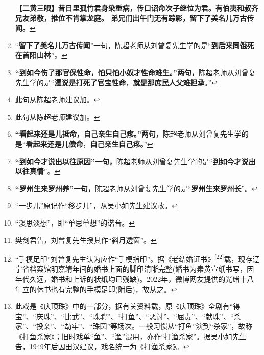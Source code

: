 \begin{enumerate}
  \textbf{【二黄三眼】昔日里孤竹君身染重病，传口诏命次子继位为君。有伯夷和叔齐兄友弟敬，推位不肯掌龙庭。
  弟兄们出午门无有踪影，留下了美名儿万古传闻。}\protect\hyperlink{fnref502}{↩}
\item
  \leavevmode\hypertarget{fn503}{}%
  ``\textbf{留下了美名儿万古传闻}''一句，陈超老师从刘曾复先生学的是``\textbf{到后来同饿死在首阳山林}''。\protect\hyperlink{fnref503}{↩}
\item
  \leavevmode\hypertarget{fn504}{}%
  \textbf{``到如今伤了那官保性命，怕只怕小奴才性命难生。''两句，}陈超老师从刘曾复先生学的是``\textbf{漫说是打死了官宝性命}，\textbf{就是那庶民人父难担承}。''\protect\hyperlink{fnref504}{↩}
\item
  \leavevmode\hypertarget{fn505}{}%
  此句从陈超老师建议加。\protect\hyperlink{fnref505}{↩}
\item
  \leavevmode\hypertarget{fn506}{}%
  此句从陈超老师建议加。\protect\hyperlink{fnref506}{↩}
\item
  \leavevmode\hypertarget{fn507}{}%
  \textbf{``看起来还是儿抵命，自己亲生自己疼。''两句，}陈超老师从刘曾复先生学的是``\textbf{看起来还是儿偿命}，\textbf{自己亲生自己疼。}''\protect\hyperlink{fnref507}{↩}
\item
  \leavevmode\hypertarget{fn508}{}%
  \textbf{``到如今才说出以往原因''一句，}陈超老师从刘曾复先生学的是``\textbf{到如今才说出以往真情}''。\protect\hyperlink{fnref508}{↩}
\item
  \leavevmode\hypertarget{fn509}{}%
  \textbf{``罗州生来罗州养''一句，}陈超老师从刘曾复先生学的是``\textbf{罗州生来罗州长}''。\protect\hyperlink{fnref509}{↩}
\item
  \leavevmode\hypertarget{fn510}{}%
  ``一步儿''原记作``移步儿''，从吴小如先生建议改。\protect\hyperlink{fnref510}{↩}
\item
  \leavevmode\hypertarget{fn511}{}%
  ``淡思淡想''，即``单思单想''的谐音。\protect\hyperlink{fnref511}{↩}
\item
  \leavevmode\hypertarget{fn512}{}%
  樊剑君告，刘曾复先生授其作``斜月透窗''。\protect\hyperlink{fnref512}{↩}
\item
  \leavevmode\hypertarget{fn513}{}%
  ``手模足印''刘曾复先生认为应作``手模指印''。据《老结婚证书》\textsuperscript{{[}22{]}}载，现存辽宁省档案馆明嘉靖年间的婚书上面的脚印清晰完整(婚书为素黄宣纸书写，因年代久远，婚书和上诉的状纸均已残缺)。2022年，微博网友提供的光绪十八年立的休书也有完整的手模足印(附后)，故从之。\protect\hyperlink{fnref513}{↩}
\item
  \leavevmode\hypertarget{fn514}{}%
  此戏是《庆顶珠》中的一部分，据有关资料载，原《庆顶珠》全剧有``得宝''、``庆珠''、``比武''、``珠聘''、``打鱼''、``恶讨''、``屈责''、``献珠''、``杀家''、``投亲''、``劫牢''、``珠圆''等场次。一般习惯从``打鱼''演到``杀家''，故称《打鱼杀家》；旧时戏单``鱼''、``渔''混用，亦作``打渔杀家''。据吴小如先生告，1949年后因田汉建议，戏名统一为《打渔杀家》。\protect\hyperlink{fnref514}{↩}

\end{enumerate}
